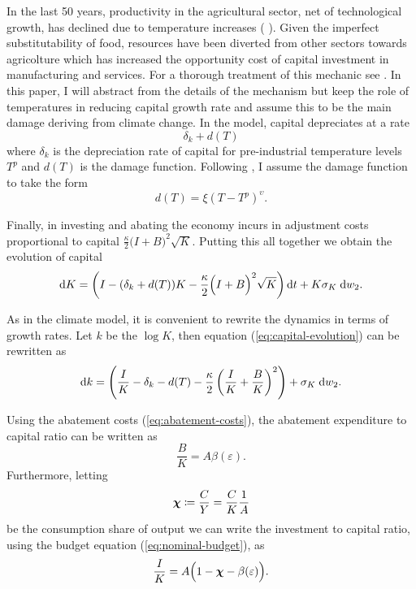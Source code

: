 \documentclass[../../main.tex]{subfiles}
\begin{document}
In the last 50 years, productivity in the agricultural sector, net of technological growth, has declined due to temperature increases (\citeauthor{dell_temperature_2009} \citeyear{dell_temperature_2009}). Given the imperfect substitutability of food, resources have been diverted from other sectors towards agricolture which has increased the opportunity cost of capital investment in manufacturing and services. For a thorough treatment of this mechanic see . In this paper, I will abstract from the details of the mechanism but keep the role of temperatures in reducing capital growth rate and assume this to be the main damage deriving from climate change. In the model, capital depreciates at a rate \begin{equation}
    \delta_k +  d(T)
\end{equation} where $\delta_k$ is the depreciation rate of capital for pre-industrial temperature levels $T^p$ and $d(T)$ is the damage function. Following , I assume the damage function to take the form \begin{equation}
    d(T) = \xi (T - T^p)^{\upsilon}.
\end{equation}

Finally, in investing and abating the economy incurs in adjustment costs proportional to capital $\frac{\kappa}{2} \big(I + B \big)^2 \sqrt{K}$. Putting this all together we obtain the evolution of capital \begin{equation} \label{eq:capital-evolution}
    \mathrm{d}K = \left( I - (\delta_k + d(T)) K - \frac{\kappa}{2} \Big(I + B\Big)^2 \sqrt{K} \right) \mathrm{d}t + K \sigma_K \; \mathrm{d}w_2.
\end{equation} 

As in the climate model, it is convenient to rewrite the dynamics in terms of growth rates. Let $k$ be the $\log K$, then equation (\ref{eq:capital-evolution}) can be rewritten as \begin{equation} \label{eq:capital-evolution:log:level}
    \text{d}k = \left( \frac{I}{K} - \delta_k - d(T) - \frac{\kappa}{2} \left(\frac{I}{K} + \frac{B}{K}\right)^2 \right) + \sigma_K \; \mathrm{d}w_2.
\end{equation}

Using the abatement costs (\ref{eq:abatement-costs}), the abatement expenditure to capital ratio can be written as \begin{equation}
    \frac{B}{K} = A \beta(\varepsilon).
\end{equation} Furthermore, letting \begin{equation}
    \bm{\chi} \coloneqq \frac{C}{Y} = \frac{C}{K} \frac{1}{A}
\end{equation} be the consumption share of output we can write the investment to capital ratio, using the budget equation (\ref{eq:nominal-budget}), as \begin{equation}
    \frac{I}{K} = A \Big(1 - \bm{\chi} - \beta(\varepsilon)\Big).
\end{equation}
\end{document}
